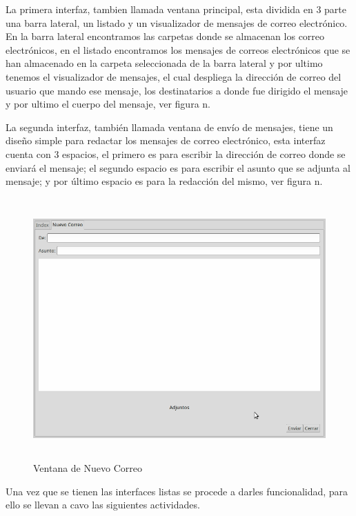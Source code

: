 \documentclass[12pt,oneside,onecolumn,openany]{report}
\begin{document}
La primera  interfaz, tambien llamada ventana principal, esta dividida en 3 parte una barra lateral, un listado y un visualizador de mensajes de correo electrónico. En la barra lateral encontramos las carpetas donde se almacenan los correo electrónicos, en el listado encontramos los mensajes de correos electrónicos que se han almacenado en la carpeta seleccionada de la barra lateral y por ultimo tenemos el visualizador de mensajes, el cual  despliega la dirección de correo del usuario que mando ese mensaje, los destinatarios a donde fue dirigido el mensaje y por ultimo el cuerpo del mensaje, ver figura n.

La segunda interfaz, también llamada ventana de envío de mensajes,  tiene un diseño simple para redactar los mensajes de correo electrónico, esta interfaz cuenta con 3 espacios, el primero es para escribir la dirección de correo donde se enviará el mensaje; el segundo espacio es para escribir el asunto que se adjunta al mensaje; y por último espacio es para la redacción del mismo, ver figura n.
\begin{figure}[H]
\centering
	\includegraphics[width=15cm, height=10cm]{./images/VentanaNewCorreo.png}
	\caption{Ventana de Nuevo Correo}
	\label{fig:6-10-3}
\end{figure}
Una vez que se tienen las interfaces listas se procede a darles funcionalidad, para ello se llevan a cavo las siguientes actividades.
\end{document}
